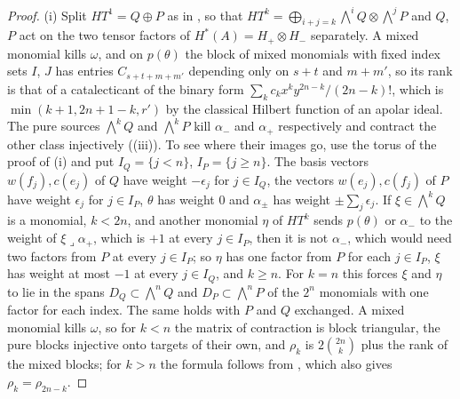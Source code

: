 \begin{proof}
(i) Split $HT^{1}=Q\oplus P$ as in , so that
$HT^{k}=\bigoplus_{i+j=k}\bigwedge^{i}Q\otimes\bigwedge^{j}P$ and $Q$, $P$ act
on the two tensor factors of $H^{*}(A)=H_{+}\otimes H_{-}$ separately. A mixed
monomial kills $\omega$, and on $p(\theta)$ the block of mixed monomials with
fixed index sets $I$, $J$ has entries $C_{s+t+m+m'}$ depending only on
$s+t$ and $m+m'$, so its rank is that of a catalecticant of the binary form
$\sum_{k}c_{k}x^{k}y^{2n-k}/(2n-k)!$, which is $\min(k+1,2n+1-k,r')$ by the
classical Hilbert function of an apolar ideal. The pure sources
$\bigwedge^{k}Q$ and $\bigwedge^{k}P$ kill $\alpha_{-}$ and $\alpha_{+}$
respectively and contract the other class injectively
((iii)). To see where their images go, use the torus of
the proof of (i) and put $I_{Q}=\{j<n\}$,
$I_{P}=\{j\ge n\}$. The basis vectors $w(f_{j}),c(e_{j})$ of $Q$ have weight
$-\epsilon_{j}$ for $j\in I_{Q}$, the vectors $w(e_{j}),c(f_{j})$ of $P$ have
weight $\epsilon_{j}$ for $j\in I_{P}$, $\theta$ has weight $0$ and
$\alpha_{\pm}$ has weight $\pm\sum_{j}\epsilon_{j}$. If $\xi\in\bigwedge^{k}Q$
is a monomial, $k<2n$, and another monomial $\eta$ of $HT^{k}$ sends
$p(\theta)$ or $\alpha_{-}$ to the weight of $\xi\lrcorner\alpha_{+}$, which is
$+1$ at every $j\in I_{P}$, then it is not $\alpha_{-}$, which would need two
factors from $P$ at every $j\in I_{P}$; so $\eta$ has one factor from $P$ for
each $j\in I_{P}$, $\xi$ has weight at most $-1$ at every $j\in I_{Q}$, and
$k\ge n$. For $k=n$ this forces $\xi$ and $\eta$ to lie in the spans
$D_{Q}\subset\bigwedge^{n}Q$ and $D_{P}\subset\bigwedge^{n}P$ of the $2^{n}$
monomials with one factor for each index. The same holds with $P$ and $Q$
exchanged. A mixed monomial kills
$\omega$, so for $k<n$ the matrix of contraction is block triangular, the pure
blocks injective onto targets of their own, and $\rho_{k}$ is $2\binom{2n}{k}$
plus the rank of the mixed blocks; for $k>n$ the formula follows from
\cite[Lemma~3.33]{paperIII}, which also gives $\rho_{k}=\rho_{2n-k}$.


\end{proof}
